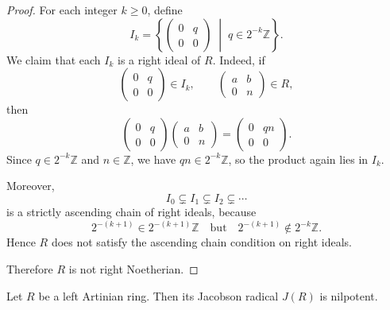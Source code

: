 \begin{proof}
    For each integer $k\ge 0$, define
    \[
        I_k=
        \left\{
        \begin{pmatrix}
            0 & q \\
            0 & 0
        \end{pmatrix}
        \;\middle|\;
        q\in 2^{-k}\mathbb{Z}
        \right\}.
    \]
    We claim that each $I_k$ is a right ideal of $R$. Indeed, if
    \[
        \begin{pmatrix}
            0 & q \\
            0 & 0
        \end{pmatrix}\in I_k,
        \qquad
        \begin{pmatrix}
            a & b \\
            0 & n
        \end{pmatrix}\in R,
    \]
    then
    \[
        \begin{pmatrix}
            0 & q \\
            0 & 0
        \end{pmatrix}
        \begin{pmatrix}
            a & b \\
            0 & n
        \end{pmatrix}
        =
        \begin{pmatrix}
            0 & qn \\
            0 & 0
        \end{pmatrix}.
    \]
    Since $q\in 2^{-k}\mathbb{Z}$ and $n\in\mathbb{Z}$, we have
    $qn\in 2^{-k}\mathbb{Z}$, so the product again lies in $I_k$.

    Moreover,
    \[
        I_0\subsetneq I_1\subsetneq I_2\subsetneq \cdots
    \]
    is a strictly ascending chain of right ideals, because
    \[
        2^{-(k+1)}\in 2^{-(k+1)}\mathbb{Z}
        \quad\text{but}\quad
        2^{-(k+1)}\notin 2^{-k}\mathbb{Z}.
    \]
    Hence $R$ does not satisfy the ascending chain condition on right ideals.

    Therefore $R$ is not right Noetherian.
\end{proof}

\begin{lemma}
    Let $R$ be a left Artinian ring. Then its Jacobson radical $J(R)$ is nilpotent.
\end{lemma}

